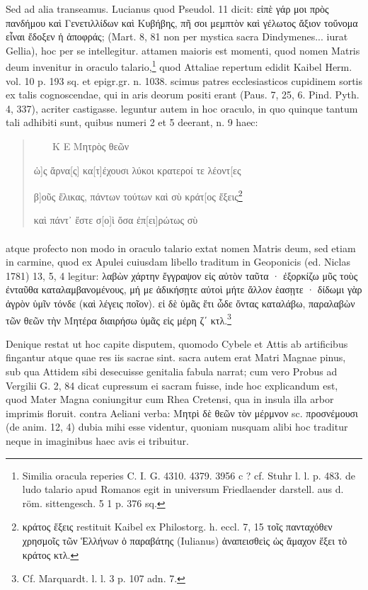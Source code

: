 \documentclass[a4paper, 11pt, oneside, polutonikogreek, german, twocolumn]{article}
\newcommand*\svgAA{}
\newcommand*\svgAB{}
\newcommand*\svgAC{}
\begin{document}
Sed ad alia transeamus. Lucianus quod Pseudol. 11 dicit: εἰπὲ γάρ μοι πρὸς πανδήμου καὶ Γενετιλλίδων καὶ Κυβήβης, πῆ σοι μεμπτὸν καὶ γέλωτος ἄξιον τοὔνομα εἶναι ἔδοξεν ἡ ἀποφράς; (Mart. 8, 81 non per mystica sacra Dindymenes... iurat Gellia), hoc per se intellegitur. attamen maioris est momenti, quod nomen Matris deum invenitur in oraculo talario,\footnote{Similia oracula reperies C. I. G. 4310. 4379. 3956 c ? cf. Stuhr l. l. p. 483. de ludo talario apud Romanos egit in universum Friedlaender darstell. aus d. röm. sittengesch. 5 1 p. 376 sq.} quod Attaliae repertum edidit Kaibel Herm. vol. 10 p. 193 sq. et epigr.gr. n. 1038. scimus patres ecclesiasticos cupidinem sortis ex talis cognoscendae, qui in aris deorum positi erant (Paus. 7, 25, 6. Pind. Pyth. 4, 337), acriter castigasse. leguntur autem in hoc oraculo, in quo quinque tantum tali adhibiti sunt, quibus numeri 2 et 5 deerant, n. 9 haec:
\begin{quotation}
$\svgAA\:\:\svgAA\:\:\svgAA\:\:\:\svgAB$ K E Μητρὸς θεῶν

ὡ]ς ἄρνα[ς] κα[τ]έχουσι λύκοι κρατεροί τε λέοντ[ες

β]οῦς ἕλικας, πάντων τούτων καὶ σὺ κράτ[ος ἕξεις\footnote{κράτος ἕξεις restituit Kaibel ex Philostorg. h. eccl. 7, 15 τοῖς πανταχόθεν χρησμοῖς τῶν Ἑλλήνων ὁ παραβάτης (Iulianus) ἀναπεισθεὶς ὡς ἄμαχον ἕξει τὸ κράτος κτλ.}

καὶ πάντ᾽ ἔστε σ[ο]ὶ ὅσα ἐπ[ει]ρώτως σὺ $\svgAC\:\:\svgAC$
\end{quotation}
\paragraph{}
atque profecto non modo in oraculo talario extat nomen Matris deum, sed etiam in carmine, quod ex Apulei cuiusdam libello traditum in Geoponicis (ed. Niclas 1781) 13, 5, 4 legitur: λαβὼν χάρτην ἔγγραψον εἰς αὐτὸν ταῦτα · ἐξορκίζω μῦς τοὺς ἐνταῦθα καταλαμβανομένους, μή με ἀδικήσῃτε αὐτοὶ μήτε ἄλλον ἑασῃτε · δίδωμι γὰρ ἀγρὸν ὑμῖν τόνδε (καὶ λέγεις ποῖον). εἰ δὲ ὑμᾶς ἔτι ὧδε ὄντας καταλάβω, παραλαβὼν τῶν θεῶν τὴν Μητέρα διαιρήσω ὑμᾶς εἰς μέρη ζ΄ κτλ.\footnote{Cf. Marquardt. l. l. 3 p. 107 adn. 7.}

Denique restat ut hoc capite disputem, quomodo Cybele et Attis ab artificibus fingantur atque quae res iis sacrae sint. sacra autem erat Matri Magnae pinus, sub qua Attidem sibi desecuisse genitalia fabula narrat; cum vero Probus ad Vergilii G. 2, 84 dicat cupressum ei sacram fuisse, inde hoc explicandum est, quod Mater Magna coniungitur cum Rhea Cretensi, qua in insula illa arbor imprimis floruit. contra Aeliani verba: Μητρὶ δὲ θεῶν τὸν μέρμνον sc. προσνέμουσι (de anim. 12, 4) dubia mihi esse videntur, quoniam nusquam alibi hoc traditur neque in imaginibus haec avis ei tribuitur.
\end{document}
